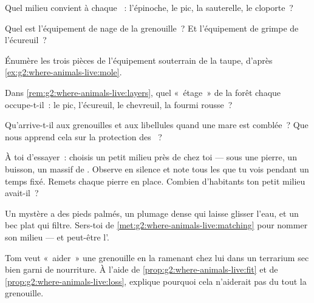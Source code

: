 \begin{exercise}[$\star$]\label{exo:g2:where-animals-live:3}
Quel milieu convient à chaque ~: l'épinoche, le pic, la
sauterelle, le cloporte~?
\end{exercise}

\begin{exercise}[$\star$]\label{exo:g2:where-animals-live:4}
Quel est l'équipement de nage de la grenouille~? Et l'équipement de
grimpe de l'écureuil~?
\end{exercise}

\begin{exercise}[$\star$]\label{exo:g2:where-animals-live:5}
Énumère les trois pièces de l'équipement souterrain de la taupe,
d'après \cref{ex:g2:where-animals-live:mole}.
\end{exercise}

\begin{exercise}[$\star$]\label{exo:g2:where-animals-live:6}
Dans \cref{rem:g2:where-animals-live:layers}, quel «~étage~» de la
forêt chaque  occupe-t-il~: le pic, l'écureuil, le chevreuil,
la fourmi rousse~?
\end{exercise}

\begin{exercise}[$\star$]\label{exo:g2:where-animals-live:7}
Qu'arrive-t-il aux grenouilles et aux libellules quand une mare est
comblée~? Que nous apprend cela sur la protection des ~?
\end{exercise}

\begin{exercise}[$\star$]\label{exo:g2:where-animals-live:8}
À toi d'essayer~: choisis un petit milieu près de chez toi --- sous
une pierre, un buisson, un massif de . Observe en silence et
note tous les  que tu vois pendant un temps fixé. Remets
chaque pierre en place. Combien d'habitants ton petit milieu
avait-il~?
\end{exercise}

\begin{exercise}[$\star\star$]\label{exo:g2:where-animals-live:9}
Un  mystère a des pieds palmés, un plumage dense qui laisse
glisser l'eau, et un bec plat qui filtre. Sers-toi de
\cref{met:g2:where-animals-live:matching} pour nommer son milieu ---
et peut-être l'.
\end{exercise}

\begin{exercise}[$\star\star$]\label{exo:g2:where-animals-live:10}
Tom veut «~aider~» une grenouille en la ramenant chez lui dans un
terrarium sec bien garni de nourriture. À l'aide de
\cref{prop:g2:where-animals-live:fit} et de
\cref{prop:g2:where-animals-live:loss}, explique pourquoi cela
n'aiderait pas du tout la grenouille.
\end{exercise}
